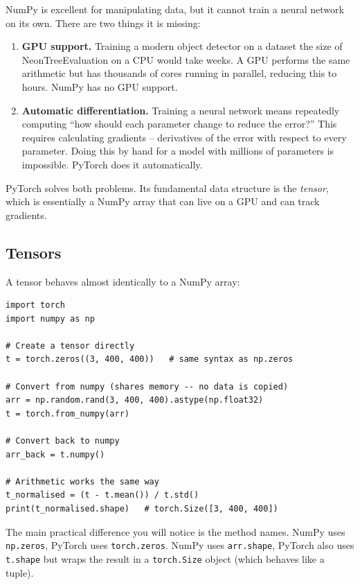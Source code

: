\documentclass[11pt, a4paper]{article}
\begin{document}
NumPy is excellent for manipulating data, but it cannot train a neural network
on its own. There are two things it is missing:

\begin{enumerate}[nosep]
  \item \textbf{GPU support.} Training a modern object detector on a dataset
        the size of NeonTreeEvaluation on a CPU would take weeks. A GPU
        performs the same arithmetic but has thousands of cores running in
        parallel, reducing this to hours. NumPy has no GPU support.
  \item \textbf{Automatic differentiation.} Training a neural network means
        repeatedly computing ``how should each parameter change to reduce the
        error?'' This requires calculating gradients -- derivatives of the
        error with respect to every parameter. Doing this by hand for a model
        with millions of parameters is impossible. PyTorch does it
        automatically.
\end{enumerate}

PyTorch solves both problems. Its fundamental data structure is the
\emph{tensor}, which is essentially a NumPy array that can live on a GPU and
can track gradients.

\subsection{Tensors}

A tensor behaves almost identically to a NumPy array:

\begin{lstlisting}
import torch
import numpy as np

# Create a tensor directly
t = torch.zeros((3, 400, 400))   # same syntax as np.zeros

# Convert from numpy (shares memory -- no data is copied)
arr = np.random.rand(3, 400, 400).astype(np.float32)
t = torch.from_numpy(arr)

# Convert back to numpy
arr_back = t.numpy()

# Arithmetic works the same way
t_normalised = (t - t.mean()) / t.std()
print(t_normalised.shape)   # torch.Size([3, 400, 400])
\end{lstlisting}

The main practical difference you will notice is the method names. NumPy uses
\lstinline{np.zeros}, PyTorch uses \lstinline{torch.zeros}. NumPy uses
\lstinline{arr.shape}, PyTorch also uses \lstinline{t.shape} but wraps the
result in a \lstinline{torch.Size} object (which behaves like a tuple).
\end{document}
